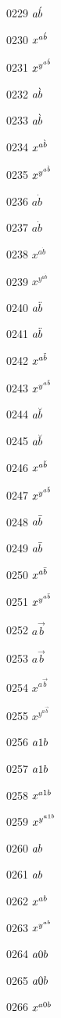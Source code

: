 \documentclass{article}
\begin{document}
0229 $\displaystyle a\Acute b$\par
0230 $x^{a\Acute b}$\par
0231 $x^{y^{a\Acute b}}$\par
0232 $a\Grave b$\par
0233 $\displaystyle a\Grave b$\par
0234 $x^{a\Grave b}$\par
0235 $x^{y^{a\Grave b}}$\par
0236 $a\Dot b$\par
0237 $\displaystyle a\Dot b$\par
0238 $x^{a\Dot b}$\par
0239 $x^{y^{a\Dot b}}$\par
0240 $a\Ddot b$\par
0241 $\displaystyle a\Ddot b$\par
0242 $x^{a\Ddot b}$\par
0243 $x^{y^{a\Ddot b}}$\par
0244 $a\Breve b$\par
0245 $\displaystyle a\Breve b$\par
0246 $x^{a\Breve b}$\par
0247 $x^{y^{a\Breve b}}$\par
0248 $a\Bar b$\par
0249 $\displaystyle a\Bar b$\par
0250 $x^{a\Bar b}$\par
0251 $x^{y^{a\Bar b}}$\par
0252 $a\Vec b$\par
0253 $\displaystyle a\Vec b$\par
0254 $x^{a\Vec b}$\par
0255 $x^{y^{a\Vec b}}$\par
0256 $a\arraystretch b$\par
0257 $\displaystyle a\arraystretch b$\par
0258 $x^{a\arraystretch b}$\par
0259 $x^{y^{a\arraystretch b}}$\par
0260 $a\ignorespacesafterend b$\par
0261 $\displaystyle a\ignorespacesafterend b$\par
0262 $x^{a\ignorespacesafterend b}$\par
0263 $x^{y^{a\ignorespacesafterend b}}$\par
0264 $a\theequation b$\par
0265 $\displaystyle a\theequation b$\par
0266 $x^{a\theequation b}$\par
\end{document}
